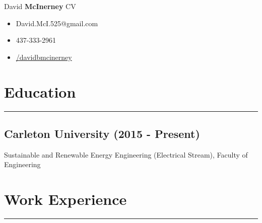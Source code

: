 \documentclass[11pt]{article}
\begin{document}
	\def\arraystretch{1.3}	 %
	\begin{minipage}[b]{0.6\textwidth}
	\begin{flushleft}
	{\noindent \Huge David \textbf{McInerney} CV}
	\end{flushleft}	 
	\end{minipage}
	\begin{minipage}[b]{0.32\textwidth}
	\begin{itemize}
		\item[{\Large \faEnvelopeO}] David.McI.525@gmail.com
		\item[{\Large \faPhone}] 437-333-2961
    	\item[{\Large \faLinkedin}]   \href{http://www.linkedin.com/in/davidbmcinerney}{/davidbmcinerney}
	\end{itemize}

	\end{minipage}
	
	
	
	
	
	\section{Education}
		\hrule \hfill %
		\subsection{Carleton University (2015 - Present)}
		\noindent Sustainable and Renewable Energy Engineering (Electrical Stream), Faculty of Engineering 
	
	\section{Work Experience}
		\hrule \hfill %
\end{document}
